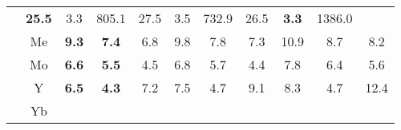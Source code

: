 \documentclass[french,10pt]{article}
\begin{document}
\begin{landscape}
\begin{longtable}{ l  c | c c c | c c c | c c c | }
                    &                     \textbf{ 25.5}
     & {\footnotesize     3.3
    } & {\footnotesize     805.1
     }
    
    
                    &                     27.5
     & {\footnotesize     3.5
    } & {\footnotesize     732.9
     }
    
    
                    &                     26.5
     & {\footnotesize     \textbf{ 3.3}
    } & {\footnotesize     1386.0
     }
    
    
                    \\*
                        & {\small Me  }

                    &                     \textbf{ 9.3}
     & {\footnotesize     \textbf{ 7.4}
    } & {\footnotesize     6.8
     }
    
    
                    &                     9.8
     & {\footnotesize     7.8
    } & {\footnotesize     7.3
     }
    
    
                    &                     10.9
     & {\footnotesize     8.7
    } & {\footnotesize     8.2
     }
    
    
                    \\*
                        & {\small Mo  }

                    &                     \textbf{ 6.6}
     & {\footnotesize     \textbf{ 5.5}
    } & {\footnotesize     4.5
     }
    
    
                    &                     6.8
     & {\footnotesize     5.7
    } & {\footnotesize     4.4
     }
    
    
                    &                     7.8
     & {\footnotesize     6.4
    } & {\footnotesize     5.6
     }
    
    
                    \\*
                        & {\small Y  }

                    &                     \textbf{ 6.5}
     & {\footnotesize     \textbf{ 4.3}
    } & {\footnotesize     7.2
     }
    
    
                    &                     7.5
     & {\footnotesize     4.7
    } & {\footnotesize     9.1
     }
    
    
                    &                     8.3
     & {\footnotesize     4.7
    } & {\footnotesize     12.4
     }
    
    
                    \\*
                        & {\small Yb  }


\end{longtable}
\end{landscape}
\end{document}
